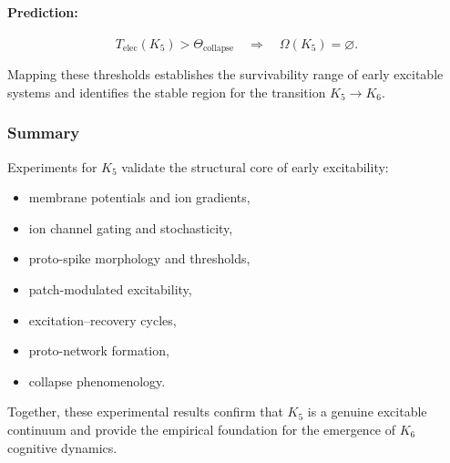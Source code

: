 \paragraph{Prediction:}

\[
   T_{\mathrm{elec}}(K_5) > \Theta_{\mathrm{collapse}}
   \quad \Rightarrow \quad
   \Omega(K_5) = \varnothing.
\]

Mapping these thresholds establishes the survivability range
of early excitable systems and identifies the stable region
for the transition $K_5 \rightarrow K_6$.



\subsubsection{Summary}

Experiments for $K_5$ validate the structural core of early excitability:

\begin{itemize}
    \item membrane potentials and ion gradients,
    \item ion channel gating and stochasticity,
    \item proto-spike morphology and thresholds,
    \item patch-modulated excitability,
    \item excitation--recovery cycles,
    \item proto-network formation,
    \item collapse phenomenology.
\end{itemize}

Together, these experimental results confirm that $K_5$ is a
genuine excitable continuum and provide the empirical foundation
for the emergence of $K_6$ cognitive dynamics.
